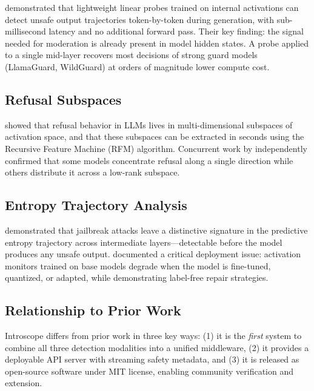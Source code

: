 \documentclass[11pt,twocolumn]{article}
\begin{document}
\textcite{hiddensstate2026} demonstrated that lightweight linear probes trained on internal activations can detect unsafe output trajectories token-by-token during generation, with sub-millisecond latency and no additional forward pass. Their key finding: the signal needed for moderation is already present in model hidden states. A probe applied to a single mid-layer recovers most decisions of strong guard models (LlamaGuard, WildGuard) at orders of magnitude lower compute cost.

\subsection{Refusal Subspaces}

\textcite{rfm2026} showed that refusal behavior in LLMs lives in multi-dimensional subspaces of activation space, and that these subspaces can be extracted in seconds using the Recursive Feature Machine (RFM) algorithm. Concurrent work by \textcite{refusalrep2026} independently confirmed that some models concentrate refusal along a single direction while others distribute it across a low-rank subspace.

\subsection{Entropy Trajectory Analysis}

\textcite{entropy2026} demonstrated that jailbreak attacks leave a distinctive signature in the predictive entropy trajectory across intermediate layers---detectable before the model produces any unsafe output. \textcite{staleness2026} documented a critical deployment issue: activation monitors trained on base models degrade when the model is fine-tuned, quantized, or adapted, while demonstrating label-free repair strategies.

\subsection{Relationship to Prior Work}

Introscope differs from prior work in three key ways: (1) it is the \emph{first} system to combine all three detection modalities into a unified middleware, (2) it provides a deployable API server with streaming safety metadata, and (3) it is released as open-source software under MIT license, enabling community verification and extension.

\end{document}
